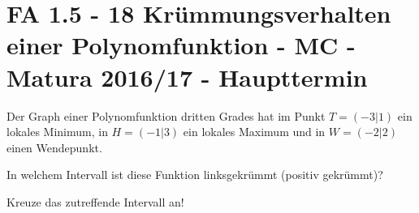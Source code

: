 \section{FA 1.5 - 18 Krümmungsverhalten einer Polynomfunktion - MC - Matura 2016/17 - Haupttermin}

\begin{beispiel}[FA 1.5]{1} %
Der Graph einer Polynomfunktion dritten Grades hat im Punkt $T = (-3|1)$ ein lokales Minimum, in $H=(-1|3)$ ein lokales Maximum und in $W = (-2|2)$ einen Wendepunkt. \leer

In welchem Intervall ist diese Funktion linksgekrümmt (positiv gekrümmt)? 

Kreuze das zutreffende Intervall an! \leer

\end{beispiel}